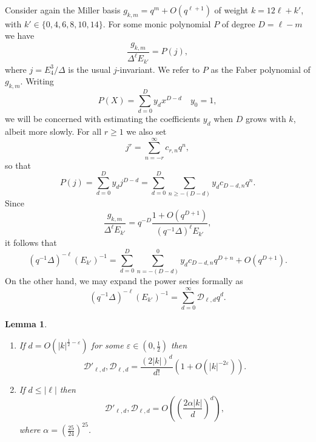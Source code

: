 \documentclass[12pt]{amsart}
\theoremstyle{plain} %
\newtheorem{lemma}      [theorem]{Lemma}
\theoremstyle{definition}
\theoremstyle{remark}
\numberwithin{equation}{section}
\begin{document}
Consider again the Miller basis $g_{k,m}=q^m+O(q^{\ell+1})$ of weight $k=12\ell+k'$, with $k'\in \{0,4,6,8,10,14\}$. For some monic polynomial $P$ of degree $D=\ell-m$ we have
\[\frac{g_{k,m}}{\Delta^\ell E_{k'}}=P(j),\] where $j=E_4^3/\Delta$ is the usual $j$-invariant.  
We refer to $P$ as the Faber polynomial of $g_{k,m}$. Writing
\[ P(X)=\sum_{d=0}^D y_dx^{D-d} \quad  y_0=1,\] we will be concerned with estimating the coefficients $y_d$ when $D$ grows with $k$, albeit more slowly.  
For all $r\ge 1$ we also set \[ j^r=\sum_{n=-r}^\infty c_{r,n}q^n, \]  so that
\[P(j)=\sum_{d=0}^D y_{d}j^{D-d}=\sum_{d=0}^D\sum_{n\geq
  -(D-d)}y_dc_{D-d,n}q^{n}.\]
Since
\[\frac{g_{k,m}}{\Delta^\ell E_{k'}}=q^{-D}\frac{1+O(q^{D+1})}{(q^{-1}\Delta)^\ell E_{k'}},\]
it follows that
\[(q^{-1}\Delta)^{-\ell}(E_{k'})^{-1}=\sum_{d=0}^D\sum_{n=
  -(D-d)}^0y_dc_{D-d,n}q^{D+n}+O(q^{D+1}).\]
On the other hand, we may expand the power series formally as
\[(q^{-1}\Delta)^{-\ell}(E_{k'})^{-1}=\sum_{d=0}^\infty\mathcal{D}_{\ell,d}q^d.\]
\begin{lemma}\label{l:rudnick-coeffs}
  \begin{enumerate}
\item If $d=O(|k|^{\frac{1}{2}-\varepsilon})$ for some $\varepsilon\in (0,\frac{1}{2})$ then
\[\mathcal{D}'_{\ell,d}, \mathcal{D}_{\ell,d}=\frac{(2|k|)^d}{d!}\left(1+O\left(|k|^{-2\varepsilon}\right)\right).\]
\item If $d\leq |\ell|$ then
\[\mathcal{D}'_{\ell,d}, \mathcal{D}_{\ell,d}=O\left(\left(\frac{2 \alpha
  |k|}{d}\right)^d\right),\]
where $\alpha=\left(\frac{25}{24}\right)^{25}$.
\end{enumerate}
\end{lemma}
\end{document}
